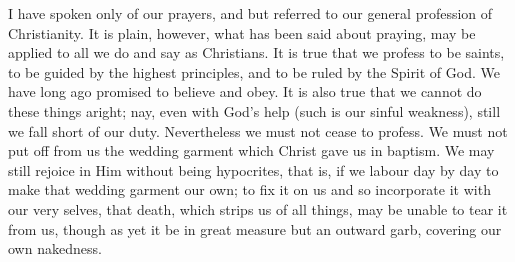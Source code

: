 I have spoken only of our prayers, and but referred to
our general profession of Christianity. It is plain,
however, what has been said about praying, may be applied
to all we do and say as Christians. It is true that we
profess to be saints, to be guided by the highest
principles, and to be ruled by the Spirit of God. We have
long ago promised to believe and obey. It is also true
that we cannot do these things aright; nay, even with
God's help (such is our sinful weakness), still we fall
short of our duty. Nevertheless we must not cease to
profess. We must not put off from us the wedding garment
which Christ gave us in baptism. We may still rejoice in
Him without being hypocrites, that is, if we labour day
by day to make that wedding garment our own; to fix it on
us and so incorporate it with our very selves, that
death, which strips us of all things, may be unable to
tear it from us, though as yet it be in great measure but
an outward garb, covering our own nakedness.

